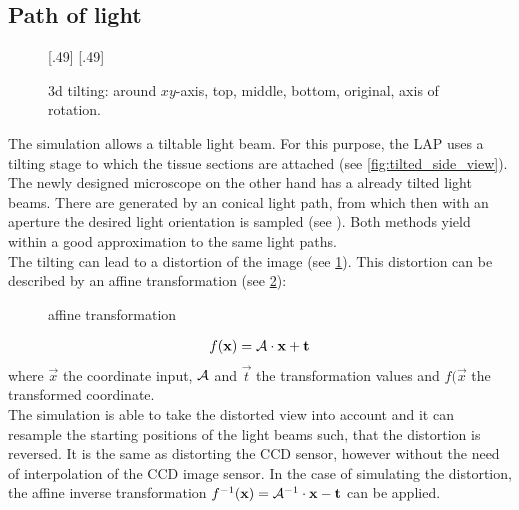 \subsection{Path of light}
\label{sec:pathOfLight}
%
\begin{figure}[!t]
\setlength{\tikzheight}{0.42\textwidth}
[.49\textwidth]{
}\hfill
{}[.49\textwidth]{
}
\tikzset{external/export=false}
\caption[3d tilting]{3d tilting: around $xy$-axis, \raisebox{.25em}{\tikz \draw[red,thick](0,0)--(0.25,0);} top, \raisebox{.25em}{\tikz \draw[green,thick](0,0)--(0.25,0);} middle, \raisebox{.25em}{\tikz \draw[blue,thick](0,0)--(0.25,0);} bottom, \raisebox{.25em}{\tikz \draw[dash pattern=on 1.25pt off 1.25pt,thick](0,0)--(0.25,0);} original, \raisebox{.25em}{\tikz \draw[gray](0,0)--(0.25,0);} axis of rotation.}
\label{fig:tilting_camera_view}
\end{figure}
%
The simulation allows a tiltable light beam.
For this purpose, the \ac{LAP} uses a tilting stage to which the tissue sections are attached (see \cref{fig:tilted_side_view}).
The newly designed microscope on the other hand has a already tilted light beams.
There are generated by an conical light path, from which then with an aperture the desired light orientation is sampled (see \cite{Wiese:887678}).
Both methods yield within a good approximation to the same light paths.
\\
%
The tilting can lead to a distortion of the image (see \cref{fig:tilting_camera_view}).
This distortion can be described by an affine transformation (see \cref{fig::affine_transformation}):
%
\begin{figure}[!t]
\centering

\caption{affine transformation}
\label{fig::affine_transformation}
\end{figure}
%
\begin{align}
f(\mathbf{x}) = \mathcal{A} \cdot \mathbf{x} + \mathbf{t}
\end{align}
where $\vec{x}$ the coordinate input, $\mathcal{A}$ and $\vec{t}$ the transformation values and $f(\vec{x}$ the transformed coordinate.
\\
%
The simulation is able to take the distorted view into account and it can resample the starting positions of the light beams such, that the distortion is reversed.
It is the same as distorting the \ac{CCD} sensor, however without the need of interpolation of the \ac{CCD} image sensor.
In the case of simulating the distortion, the affine inverse transformation $f^{-1}(\mathbf{x}) = \mathcal{A}^{-1} \cdot \mathbf{x} - \mathbf{t}$ can be applied.
